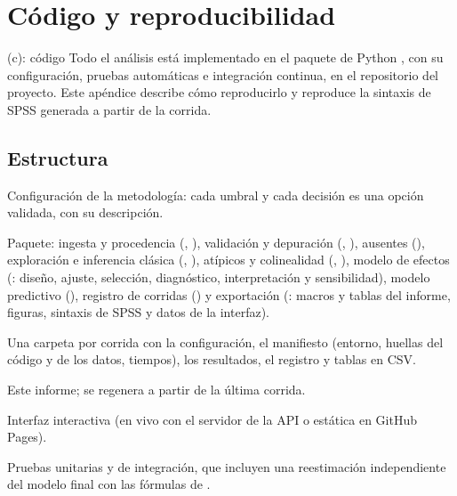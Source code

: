 \chapter{Código y reproducibilidad}\label{ap:reproducibilidad}

\begin{entregable}{(c): código}
Todo el análisis está implementado en el paquete de Python , con su
configuración, pruebas automáticas e integración continua, en el repositorio del proyecto. Este
apéndice describe cómo reproducirlo y reproduce la sintaxis de SPSS generada a partir de la
corrida.
\end{entregable}

\section{Estructura}

\begingroup\raggedright
\begin{description}[style=nextline,leftmargin=1.2em]
  \item[\var{config/default.yaml}] Configuración de la metodología: cada umbral y cada decisión es
  una opción validada, con su descripción.
  \item[\var{src/cancerstats/}] Paquete: ingesta y procedencia (, ),
  validación y depuración (, ), ausentes (), exploración
  e inferencia clásica (, ), atípicos y colinealidad
  (, ), modelo de efectos (: diseño, ajuste,
  selección, diagnóstico, interpretación y sensibilidad), modelo predictivo (),
  registro de corridas () y exportación (: macros y tablas del informe,
  figuras, sintaxis de SPSS y datos de la interfaz).
  \item[\var{runs/}] Una carpeta por corrida con la configuración, el manifiesto (entorno, huellas
  del código y de los datos, tiempos), los resultados, el registro y tablas en CSV.
  \item[\var{report/}] Este informe;  se regenera a partir de la última
  corrida.
  \item[\var{web/}] Interfaz interactiva (en vivo con el servidor de la API o estática en GitHub
  Pages).
  \item[\var{tests/}] Pruebas unitarias y de integración, que incluyen una reestimación
  independiente del modelo final con las fórmulas de .
\end{description}
\endgroup

